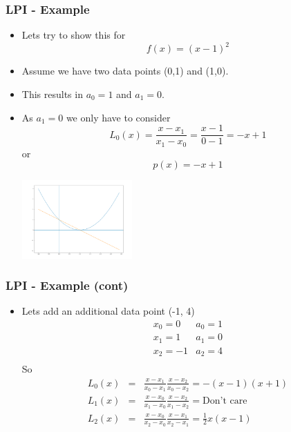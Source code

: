 \documentclass[10pt]{beamer}
\begin{document}
\begin{frame}
  \frametitle{LPI - Example}
  \begin{itemize}
  \item Lets try to show this for
    \[
      f(x) = (x-1)^2
    \]
  \item Assume we have two data points (0,1) and (1,0). 
  \item This results in $a_0 = 1$ and $a_1= 0$. 
  \item As $a_1 = 0$ we only have to consider 
    \[
      L_0 (x) = \frac{x - x_1}{x_1 - x_0} = \frac{ x - 1 } { 0 -1 } = -x + 1
    \]
    or \pause
    \[
      p(x) = -x + 1
    \]
    \centerline{\includegraphics[height=3cm]{Figure_1}}
  \end{itemize}
\end{frame}

\begin{frame}
  \frametitle{LPI - Example (cont)}
  \begin{itemize}
  \item Lets add an additional data point (-1, 4)
    \[
      \begin{array}{ll}
        x_0 = 0 & a_0 = 1 \\
        x_1 = 1 & a_1 = 0 \\
        x_2 = -1& a_2 = 4 \\
      \end{array}
    \]
    So    
    \[
      \begin{array}{lll}
        L_0(x) & = & \frac{x-x_1}{x_0-x_1} \frac{x - x_2}{x_0-x_2} = -(x-1)(x+1)\\
        L_1(x) & = & \frac{x-x_0}{x_1-x_0} \frac{x - x_2}{x_1-x_2} = \mbox{Don't care}\\
        L_2(x) & = & \frac{x-x_0}{x_2-x_0} \frac{x - x_1}{x_2-x_1} = \frac{1}{2} x (x-1)\\
      \end{array}
    \]
  \end{itemize}
\end{frame}
\end{document}
